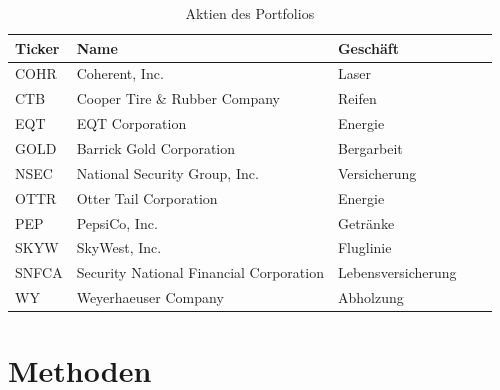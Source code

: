 \documentclass[12pt]{article}
\begin{document}
            \begin{table}[htp]
                \begin{center}
                    
                    \begin{tabular}{ | l | l | l | l | l | }

                        \hline
                        \textbf{Ticker}      & \textbf{Name}                             & \textbf{Geschäft} \\
                        \hline
                        COHR                 & Coherent, Inc.                            & Laser \\
                        CTB                  & Cooper Tire \& Rubber Company             & Reifen \\
                        EQT                  & EQT Corporation                           & Energie \\
                        GOLD                 & Barrick Gold Corporation                  & Bergarbeit \\
                        NSEC                 & National Security Group, Inc.             & Versicherung \\
                        OTTR                 & Otter Tail Corporation                    & Energie \\
                        PEP                  & PepsiCo, Inc.                             & Getränke \\
                        SKYW                 & SkyWest, Inc.                             & Fluglinie \\
                        SNFCA                & Security National Financial Corporation   & Lebensversicherung \\
                        WY                   & Weyerhaeuser Company                      & Abholzung \\
                        \hline

                    \end{tabular}
                    \caption{Aktien des Portfolios}
                    \label{Aktien-Portfolio}

                \end{center}
            \end{table}

            \newpage \section{Methoden}
\end{document}
